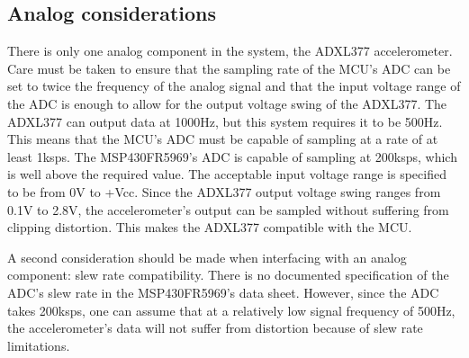\subsection{Analog considerations}
There is only one analog component in the system, the ADXL377 accelerometer. Care must be taken to ensure that the sampling rate of the MCU's ADC can be set to twice the frequency of the analog signal and that the input voltage range of the ADC is enough to allow for the output voltage swing of the ADXL377. The ADXL377 can output data at 1000Hz, but this system requires it to be 500Hz. This means that the MCU's ADC must be capable of sampling at a rate of at least 1ksps. The MSP430FR5969's ADC is capable of sampling at 200ksps, which is well above the required value.  The acceptable input voltage range is specified to be from 0V to +Vcc. Since the ADXL377 output voltage swing ranges from 0.1V to 2.8V, the accelerometer's output can be sampled without suffering from clipping distortion.  This makes the ADXL377 compatible with the MCU.

A second consideration should be made when interfacing with an analog component: slew rate compatibility. There is no documented specification of the ADC's slew rate in the MSP430FR5969's data sheet. However, since the ADC takes 200ksps, one can assume that at a relatively low signal frequency of 500Hz, the accelerometer's data will not suffer from distortion because of slew rate limitations.

